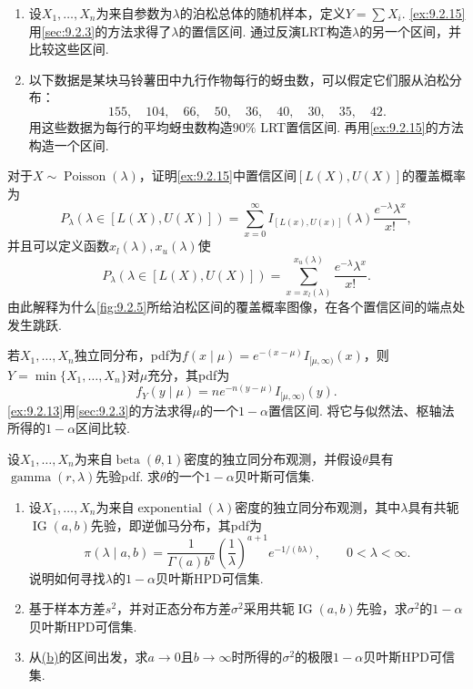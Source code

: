 \begin{exercise}\label{exercise:9.23}\leavevmode
\begin{enumerate}
\item 设$X_1,\ldots,X_n$为来自参数为$\lambda$的泊松总体的随机样本，定义$Y=\sum X_i$. \autoref{ex:9.2.15}用\autoref{sec:9.2.3}的方法求得了$\lambda$的置信区间. 通过反演LRT构造$\lambda$的另一个区间，并比较这些区间.
\item 以下数据是某块马铃薯田中九行作物每行的蚜虫数，可以假定它们服从泊松分布：
$$155,\quad104,\quad66,\quad50,\quad36,\quad40,\quad30,\quad35,\quad42.$$
用这些数据为每行的平均蚜虫数构造$90\%$ LRT置信区间. 再用\autoref{ex:9.2.15}的方法构造一个区间.
\end{enumerate}
\end{exercise}
\begin{exercise}\label{exercise:9.24}
对于$X\sim\operatorname{Poisson}(\lambda)$，证明\autoref{ex:9.2.15}中置信区间$[L(X),U(X)]$的覆盖概率为
$$P_\lambda(\lambda\in[L(X),U(X)])=\sum_{x=0}^\infty I_{[L(x),U(x)]}(\lambda)\frac{e^{-\lambda}\lambda^x}{x!},$$
并且可以定义函数$x_l(\lambda),x_u(\lambda)$使
$$P_\lambda(\lambda\in[L(X),U(X)])=\sum_{x=x_l(\lambda)}^{x_u(\lambda)}\frac{e^{-\lambda}\lambda^x}{x!}.$$
由此解释为什么\autoref{fig:9.2.5}所给泊松区间的覆盖概率图像，在各个置信区间的端点处发生跳跃.
\end{exercise}
\begin{exercise}\label{exercise:9.25}
若$X_1,\ldots,X_n$独立同分布，pdf为$f(x\mid\mu)=e^{-(x-\mu)}I_{[\mu,\infty)}(x)$，则$Y=\min\{X_1,\ldots,X_n\}$对$\mu$充分，其pdf为
$$f_Y(y\mid\mu)=ne^{-n(y-\mu)}I_{[\mu,\infty)}(y).$$
\autoref{ex:9.2.13}用\autoref{sec:9.2.3}的方法求得$\mu$的一个$1-\alpha$置信区间. 将它与似然法、枢轴法所得的$1-\alpha$区间比较.
\end{exercise}
\begin{exercise}\label{exercise:9.26}
设$X_1,\ldots,X_n$为来自$\operatorname{beta}(\theta,1)$密度的独立同分布观测，并假设$\theta$具有$\operatorname{gamma}(r,\lambda)$先验pdf. 求$\theta$的一个$1-\alpha$贝叶斯可信集.
\end{exercise}
\begin{exercise}\label{exercise:9.27}\leavevmode
\begin{enumerate}
\item 设$X_1,\ldots,X_n$为来自$\operatorname{exponential}(\lambda)$密度的独立同分布观测，其中$\lambda$具有共轭$\operatorname{IG}(a,b)$先验，即逆伽马分布，其pdf为
$$\pi(\lambda\mid a,b)=\frac1{\Gamma(a)b^a}\left(\frac1\lambda\right)^{a+1}e^{-1/(b\lambda)},\qquad0<\lambda<\infty.$$
说明如何寻找$\lambda$的$1-\alpha$贝叶斯HPD可信集.
\item\label{item:9.27.b}基于样本方差$s^2$，并对正态分布方差$\sigma^2$采用共轭$\operatorname{IG}(a,b)$先验，求$\sigma^2$的$1-\alpha$贝叶斯HPD可信集.
\item 从\hyperref[item:9.27.b]{(b)}的区间出发，求$a\to0$且$b\to\infty$时所得的$\sigma^2$的极限$1-\alpha$贝叶斯HPD可信集.
\end{enumerate}
\end{exercise}
